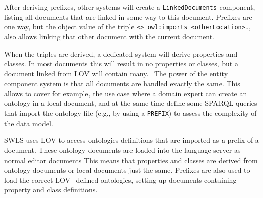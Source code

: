 After deriving prefixes, other systems will create a \texttt{LinkedDocuments} component, listing all documents that are linked in some way to this document.
Prefixes are one way, but the object value of the triple \texttt{<> owl:imports <otherLocation>.}, also allows linking that other document with the current document.

When the triples are derived, a dedicated system will derive properties and classes.
In most documents this will result in no properties or classes, but a document linked from LOV will contain many.~
The power of the entity component system is that all documents are handled exactly the same.
This allows to cover for example, the use case where a domain expert can create an ontology in a local document, and at the same time define some SPARQL queries that import the ontology file (e.g., by using a \texttt{PREFIX}) to assess the complexity of the data model.

SWLS uses LOV\cite{LOV2017} to access ontologies definitions that are imported as a prefix of a document.
These ontology documents are loaded into the language server as normal editor documents
This means that properties and classes are derived from ontology documents or local documents just the same.
Prefixes are also used to load the correct LOV~\cite{LOV2017} defined ontologies, setting up documents containing property and class definitions.~

